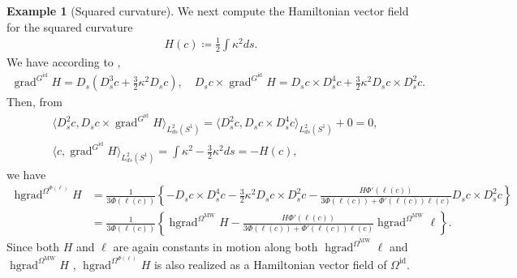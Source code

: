 \documentclass[12pt]{amsart}
\newcommand{\rev}[1]{#1}
\theoremstyle{definition}
\newtheorem{example}[theorem]{Example}
\newcommand{\id}{\mathrm{id}}
\newcommand{\OmMW}{\Omega^{\operatorname{MW}}}
\def\ka{\kappa}
\def\Ph{\Phi}
\def\Om{\Omega}
\def\x{\times}
\let\on=\operatorname
\begin{document}
\begin{example}[Squared curvature]\label{ex:squaredcurv}
    We next compute the Hamiltonian vector field for the squared curvature 
    \begin{align}
        H(c)\coloneqq \frac{1}{2}\int \ka^2 ds.
    \end{align}
    We have according to \cite{chern_knöppel_pedit_pinkall_2020},
    \begin{align}
        \on{grad}^{G^\id} H=D_s \left(D^3_s c+\frac{3}{2}\ka^2 D_s c \right),
        \quad D_s c \x \on{grad}^{G^\id} H 
        = D_s c\x D_s^4 c+\frac{3}{2}\ka^2 D_s c \x D_s^2 c.
    \end{align}
    Then, from
    \begin{align}
         &\langle D_s^2 c, D_s c\x \on{grad}^{G^\id} H\rangle_{L^2_{ds}(S^1)} = \langle D_s^2 c, D_s c\x D_s^4 c \rangle_{L^2_{ds}(S^1)} +0=0,\\
         &\langle  c, \on{grad}^{G^\id} H\rangle_{L^2_{ds}(S^1)}=\int \ka^2-\frac{3}{2}\ka^2 ds =-H(c),
    \end{align}
    we have
\begin{align}
    \on{hgrad}^{\Om^{\Phi(\ell)}} H
    &=\frac{1}{3\Phi(\rev{\ell(c)})} \left\{ - D_s c\x D_s^4 c-\frac{3}{2}\ka^2 D_s c \x D_s^2 c
      -\frac{H\Phi'(\rev{\ell(c)})}{3\Phi(\rev{\ell(c)})+\Ph'(\rev{\ell(c)})\rev{\ell(c)}} 
     D_s c\x D^2_s c \right\}
     \\&=\frac{1}{3\Phi(\rev{\ell(c)})} \left\{ \on{hgrad}^{\OmMW} H
      -\frac{H\Phi'(\rev{\ell(c)})}{3\Phi(\rev{\ell(c)})+\Ph'(\rev{\ell(c)})\rev{\ell(c)}} 
     \on{hgrad}^{\OmMW} \ell\right\}.
\end{align}
    Since both $H$ and $\ell$ are again constants in motion along both $\on{hgrad}^{\OmMW} \ell$ and $\on{hgrad}^{\OmMW} H$ \cite{chern_knöppel_pedit_pinkall_2020}, $\on{hgrad}^{\Om^{\Phi(\ell)}} H$ is also realized as a Hamiltonian vector field of $\Om^{\on{id}}$.
\end{example}
\end{document}
